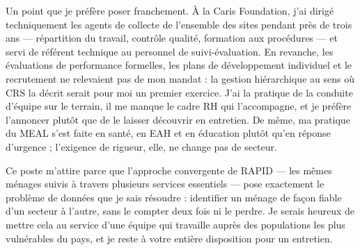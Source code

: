 \documentclass[10pt,a4paper,sans]{moderncv}
\begin{document}
Un point que je préfère poser franchement. À la Caris Foundation, j'ai dirigé techniquement les agents de collecte de l'ensemble des sites pendant près de trois ans --- répartition du travail, contrôle qualité, formation aux procédures --- et servi de référent technique au personnel de suivi-évaluation. En revanche, les évaluations de performance formelles, les plans de développement individuel et le recrutement ne relevaient pas de mon mandat : la gestion hiérarchique au sens où CRS la décrit serait pour moi un premier exercice. J'ai la pratique de la conduite d'équipe sur le terrain, il me manque le cadre RH qui l'accompagne, et je préfère l'annoncer plutôt que de le laisser découvrir en entretien. De même, ma pratique du MEAL s'est faite en santé, en EAH et en éducation plutôt qu'en réponse d'urgence ; l'exigence de rigueur, elle, ne change pas de secteur.

Ce poste m'attire parce que l'approche convergente de RAPID --- les mêmes ménages suivis à travers plusieurs services essentiels --- pose exactement le problème de données que je sais résoudre : identifier un ménage de façon fiable d'un secteur à l'autre, sans le compter deux fois ni le perdre. Je serais heureux de mettre cela au service d'une équipe qui travaille auprès des populations les plus vulnérables du pays, et je reste à votre entière disposition pour un entretien.

\makeletterclosing
\end{document}
